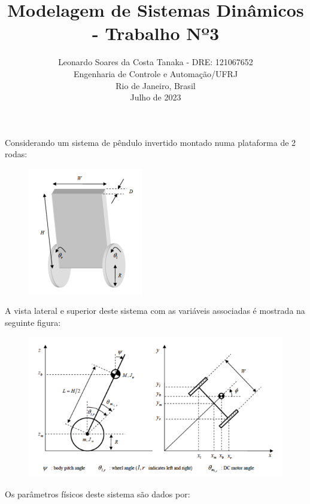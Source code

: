 \documentclass[10pt]{article}
\title{Modelagem de Sistemas Dinâmicos - Trabalho Nº3}
\author{
    Leonardo Soares da Costa Tanaka - DRE: 121067652 \\
    Engenharia de Controle e Automação/UFRJ \\
    Rio de Janeiro, Brasil \\
    Julho de 2023
}
\date{}
\begin{document}
\maketitle
\thispagestyle{capa}

\quad Considerando um sistema de pêndulo invertido montado numa plataforma de 2 rodas:

\begin{figure}[h]
    \centering
    \includegraphics[scale=1.2]{fig1.png}
\end{figure}

\quad A vista lateral e superior deste sistema com as variáveis associadas é mostrada na seguinte
figura:

\begin{figure}[h]
    \centering
    \includegraphics[scale=1.2]{fig2.png}
\end{figure}

\quad Os parâmetros físicos deste sistema são dados por:
\end{document}
